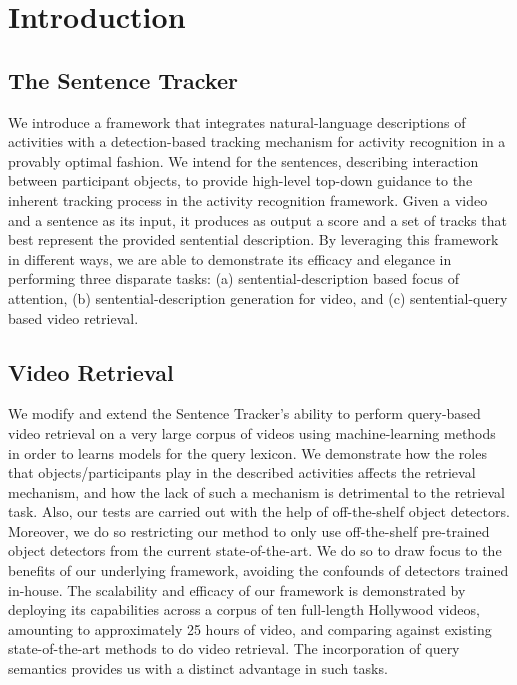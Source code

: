 \chapter{Introduction}

\section{The Sentence Tracker}
We introduce a framework that integrates natural-language descriptions of
activities with a detection-based tracking mechanism for activity recognition
in a provably optimal fashion.
%
We intend for the sentences, describing interaction between participant
objects, to provide high-level top-down guidance to the inherent tracking
process in the activity recognition framework.
%
Given a video and a sentence as its input, it produces as output a score and a
set of tracks that best represent the provided sentential description.
%
By leveraging this framework in different ways, we are able to demonstrate its
efficacy and elegance in performing three disparate tasks: (a)
sentential-description based focus of attention, (b) sentential-description
generation for video, and (c) sentential-query based video retrieval.

\section{Video Retrieval}

We modify and extend the Sentence Tracker’s ability to perform query-based
video retrieval on a very large corpus of videos using machine-learning
methods in order to learns models for the query lexicon.
%
We demonstrate how the roles that objects/participants play in the described
activities affects the retrieval mechanism, and how the lack of such a
mechanism is detrimental to the retrieval task.
%
Also, our tests are carried out with the help of off-the-shelf object
detectors.
%
Moreover, we do so restricting our method to only use off-the-shelf pre-trained
object detectors from the current state-of-the-art.
%
We do so to draw focus to the benefits of our underlying framework, avoiding
the confounds of detectors trained in-house.
%
The scalability and efficacy of our framework is demonstrated by deploying its
capabilities across a corpus of ten full-length Hollywood videos, amounting to
approximately 25 hours of video, and comparing against existing
state-of-the-art methods to do video retrieval.
%
The incorporation of query semantics provides us with a distinct advantage in
such tasks.


